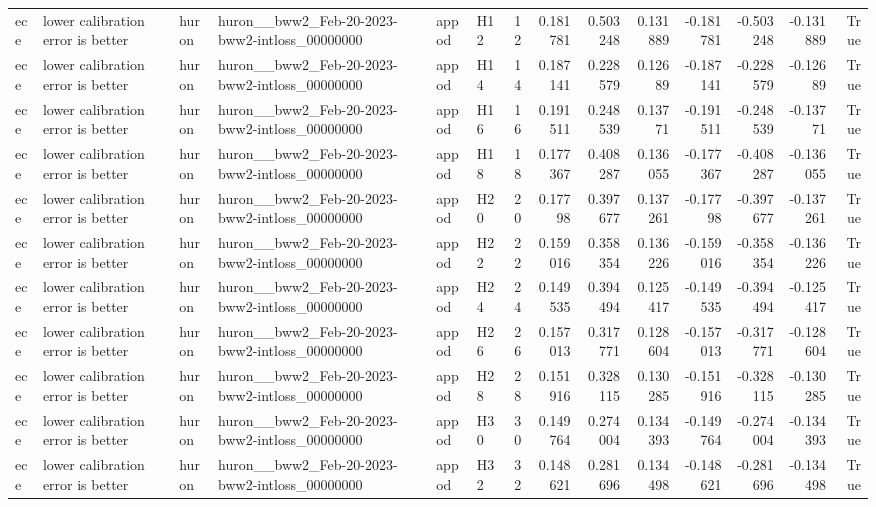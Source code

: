 \begin{longtable}{llllllrrrrrrrr}
ece & lower calibration error is better & huron & huron\_\_bww2\_Feb-20-2023-bww2-intloss\_00000000 & appod & H12 & 12 & 0.181781 & 0.503248 & 0.131889 & -0.181781 & -0.503248 & -0.131889 & True \\
ece & lower calibration error is better & huron & huron\_\_bww2\_Feb-20-2023-bww2-intloss\_00000000 & appod & H14 & 14 & 0.187141 & 0.228579 & 0.12689 & -0.187141 & -0.228579 & -0.12689 & True \\
ece & lower calibration error is better & huron & huron\_\_bww2\_Feb-20-2023-bww2-intloss\_00000000 & appod & H16 & 16 & 0.191511 & 0.248539 & 0.13771 & -0.191511 & -0.248539 & -0.13771 & True \\
ece & lower calibration error is better & huron & huron\_\_bww2\_Feb-20-2023-bww2-intloss\_00000000 & appod & H18 & 18 & 0.177367 & 0.408287 & 0.136055 & -0.177367 & -0.408287 & -0.136055 & True \\
ece & lower calibration error is better & huron & huron\_\_bww2\_Feb-20-2023-bww2-intloss\_00000000 & appod & H20 & 20 & 0.17798 & 0.397677 & 0.137261 & -0.17798 & -0.397677 & -0.137261 & True \\
ece & lower calibration error is better & huron & huron\_\_bww2\_Feb-20-2023-bww2-intloss\_00000000 & appod & H22 & 22 & 0.159016 & 0.358354 & 0.136226 & -0.159016 & -0.358354 & -0.136226 & True \\
ece & lower calibration error is better & huron & huron\_\_bww2\_Feb-20-2023-bww2-intloss\_00000000 & appod & H24 & 24 & 0.149535 & 0.394494 & 0.125417 & -0.149535 & -0.394494 & -0.125417 & True \\
ece & lower calibration error is better & huron & huron\_\_bww2\_Feb-20-2023-bww2-intloss\_00000000 & appod & H26 & 26 & 0.157013 & 0.317771 & 0.128604 & -0.157013 & -0.317771 & -0.128604 & True \\
ece & lower calibration error is better & huron & huron\_\_bww2\_Feb-20-2023-bww2-intloss\_00000000 & appod & H28 & 28 & 0.151916 & 0.328115 & 0.130285 & -0.151916 & -0.328115 & -0.130285 & True \\
ece & lower calibration error is better & huron & huron\_\_bww2\_Feb-20-2023-bww2-intloss\_00000000 & appod & H30 & 30 & 0.149764 & 0.274004 & 0.134393 & -0.149764 & -0.274004 & -0.134393 & True \\
ece & lower calibration error is better & huron & huron\_\_bww2\_Feb-20-2023-bww2-intloss\_00000000 & appod & H32 & 32 & 0.148621 & 0.281696 & 0.134498 & -0.148621 & -0.281696 & -0.134498 & True \\

\end{longtable}
